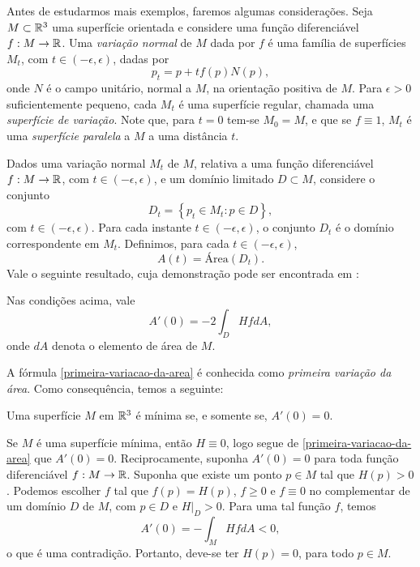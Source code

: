 Antes de estudarmos mais exemplos, faremos algumas considerações. Seja $M \subset \mathbb{R}^3$ uma superfície orientada e considere uma função diferenciável $f: M \rightarrow \mathbb{R}$. Uma \emph{variação normal} de $M$ dada por $f$ é uma família de superfícies $M_t$, com $t \in (-\epsilon,\epsilon)$, dadas por
\begin{equation*}
	p_t = p + t f(p) N(p),
\end{equation*}
onde $N$ é o campo unitário, normal a $M$, na orientação positiva de $M$. Para $\epsilon > 0$ suficientemente pequeno, cada $M_t$ é uma superfície regular, chamada uma \emph{superfície de variação}. Note que, para $t=0$ tem-se $M_0 = M$, e que se $f \equiv 1$, $M_t$ é uma \emph{superfície paralela} a $M$ a uma distância $t$.

Dados uma variação normal $M_t$ de $M$, relativa a uma função diferenciável $f: M \rightarrow \mathbb{R}$, com $t \in (-\epsilon,\epsilon)$, e um domínio limitado $D \subset M$, considere o conjunto
\begin{equation*}
	D_t = \left\{ p_t \in M_t: p \in D \right\},
\end{equation*}
com $t \in (-\epsilon,\epsilon)$. Para cada instante $t \in (-\epsilon,\epsilon)$, o conjunto $D_t$ é o domínio correspondente em $M_t$. Definimos, para cada $t \in (-\epsilon,\epsilon)$,
\begin{equation*}
	A(t) = \text{Área} (D_t).
\end{equation*}
Vale o seguinte resultado, cuja demonstração pode ser encontrada em \cite{Nitsche2011}:

\begin{teorema}
	Nas condições acima, vale
	\begin{equation}\label{primeira-variacao-da-area}
		A'(0) = -2 \int_D H f dA,
	\end{equation}
	onde $dA$ denota o elemento de área de $M$.
\end{teorema}

A fórmula \eqref{primeira-variacao-da-area} é conhecida como \emph{primeira variação da área}. Como consequência, temos a seguinte:

\begin{proposicao}\label{superficie-minima-como-ponto-critico-do-funcional-da-area}
	Uma superfície $M$ em $\mathbb{R}^3$ é mínima se, e somente se, $A'(0)=0$.
\end{proposicao}

\begin{demonstracao}
	Se $M$ é uma superfície mínima, então $H \equiv 0$, logo segue de \eqref{primeira-variacao-da-area} que $A'(0)=0$. Reciprocamente, suponha $A'(0)=0$ para toda função diferenciável $f: M \rightarrow \mathbb{R}$. Suponha que existe um ponto $p \in M$ tal que $H(p)>0$. Podemos escolher $f$ tal que $f(p) = H(p)$, $f \geq 0$ e $f \equiv 0$ no complementar de um domínio $D$ de $M$, com $p \in D$ e $H \vert_D >0$. Para uma tal função $f$, temos
	\begin{equation*}
		A'(0) = -\int_M H f dA <0,
	\end{equation*}
	o que é uma contradição. Portanto, deve-se ter $H(p)=0$, para todo $p \in M$.
\end{demonstracao}

